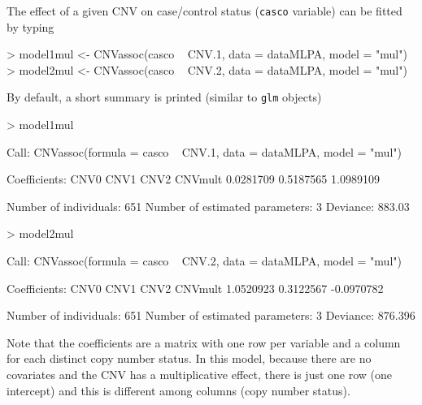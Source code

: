 \documentclass[11pt]{article}
\begin{document}
The effect of a given CNV on case/control status (\texttt{casco} variable) can be fitted by typing


\begin{Schunk}
\begin{Sinput}
> model1mul <- CNVassoc(casco ~ CNV.1, data = dataMLPA, model = "mul")
> model2mul <- CNVassoc(casco ~ CNV.2, data = dataMLPA, model = "mul")
\end{Sinput}
\end{Schunk}




By default, a short summary is printed (similar to {\tt glm} objects)



\begin{Schunk}
\begin{Sinput}
> model1mul
\end{Sinput}
\begin{Soutput}
Call:  CNVassoc(formula = casco ~ CNV.1, data = dataMLPA, model = "mul") 

Coefficients:
         CNV0       CNV1       CNV2     
CNVmult  0.0281709  0.5187565  1.0989109

Number of individuals: 651 
Number of estimated parameters: 3 
Deviance: 883.03 
\end{Soutput}
\end{Schunk}




\begin{Schunk}
\begin{Sinput}
> model2mul
\end{Sinput}
\begin{Soutput}
Call:  CNVassoc(formula = casco ~ CNV.2, data = dataMLPA, model = "mul") 

Coefficients:
         CNV0        CNV1        CNV2      
CNVmult   1.0520923   0.3122567  -0.0970782

Number of individuals: 651 
Number of estimated parameters: 3 
Deviance: 876.396 
\end{Soutput}
\end{Schunk}



Note that the coefficients are a matrix with one row per variable and a  column for each distinct copy number status. In this model, 
because there are no covariates and the CNV has a multiplicative effect, there is just one row (one intercept) and this is different 
among columns (copy number status).
\end{document}
